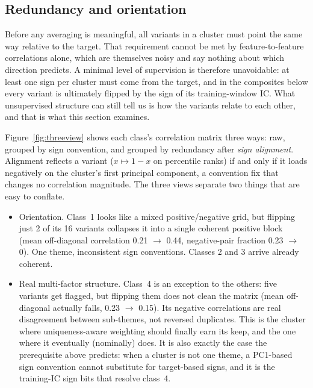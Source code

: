 \documentclass[11pt]{article}
\begin{document}
\subsection{Redundancy and orientation}
\label{sec:data-redundancy}

Before any averaging is meaningful, all variants in a cluster must point the same way
relative to the target. That requirement cannot be met by feature-to-feature correlations
alone, which are themselves noisy and say nothing about which direction predicts. A minimal
level of supervision is therefore unavoidable: at least one sign per cluster must come from
the target, and in the composites below every variant is ultimately flipped by the sign of
its training-window IC. What unsupervised structure can still tell us is how the variants
relate to each other, and that is what this section examines.

Figure~\ref{fig:threeview} shows each class's correlation matrix three ways: raw, grouped by
sign convention, and grouped by redundancy after \emph{sign alignment}. Alignment reflects a
variant ($x \mapsto 1-x$ on percentile ranks) if and only if it loads negatively on the
cluster's first principal component, a convention fix that changes no correlation magnitude.
The three views separate two things that are easy to conflate.

\begin{itemize}
\item Orientation. Class~1 looks like a mixed positive/negative grid, but flipping
      just 2 of its 16 variants collapses it into a single coherent positive block (mean
      off-diagonal correlation 0.21 $\to$ 0.44, negative-pair fraction 0.23 $\to$ 0). One
      theme, inconsistent sign conventions. Classes 2 and 3 arrive already coherent.
\item Real multi-factor structure. Class~4 is an exception to the others: five
      variants get flagged, but flipping them does not clean the matrix (mean
      off-diagonal actually falls, 0.23 $\to$ 0.15). Its negative correlations are real
      disagreement between sub-themes, not reversed duplicates. This is the cluster where
      uniqueness-aware weighting should finally earn its keep, and the one where it
      eventually (nominally) does. It is also exactly the case the prerequisite above
      predicts: when a cluster is not one theme, a PC1-based sign convention cannot
      substitute for target-based signs, and it is the training-IC sign bits that
      resolve class~4.
\end{itemize}
\end{document}
